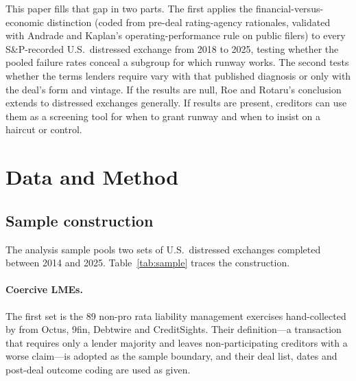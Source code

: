 \documentclass[12pt]{article}
\begin{document}
This paper fills that gap in two parts. The first applies the financial-versus-economic distinction (coded from pre-deal rating-agency rationales, validated with Andrade and Kaplan's operating-performance rule on public filers) to every S\&P-recorded U.S.\ distressed exchange from 2018 to 2025, testing whether the pooled failure rates conceal a subgroup for which runway works. The second tests whether the terms lenders require vary with that published diagnosis or only with the deal's form and vintage. If the results are null, Roe and Rotaru's conclusion extends to distressed exchanges generally. If results are present, creditors can use them as a screening tool for when to grant runway and when to insist on a haircut or control.

\section{Data and Method}

\subsection{Sample construction}

The analysis sample pools two sets of U.S.\ distressed exchanges completed between 2014 and 2025. Table~\ref{tab:sample} traces the construction.



\paragraph{Coercive LMEs.} The first set is the 89 non-pro rata liability management exercises hand-collected by \citet{roerotaru2026} from Octus, 9fin, Debtwire and CreditSights. Their definition---a transaction that requires only a lender majority and leaves non-participating creditors with a worse claim---is adopted as the sample boundary, and their deal list, dates and post-deal outcome coding are used as given.
\end{document}

